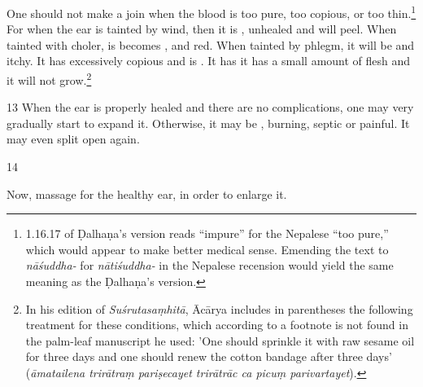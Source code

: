 \begin{translation}
One should not make a join when the blood is too pure, too copious, or too
thin.\footnote{1.16.17 of Ḍalhaṇa's version \citep[79]{vulgate} reads “impure” for
    the Nepalese “too pure,” which would appear to make better medical sense. 
    Emending the text to \emph{nāśuddha-} for \emph{nātiśuddha-} in the Nepalese
    recension would yield the same meaning as the Ḍalhaṇa's version.} For when the ear
    is tainted by wind, then it is , unhealed and
    will peel. When tainted with choler, is becomes ,
     and red.  When tainted by phlegm, it will be 
    and itchy.  It has excessively copious  and is .  It has it has a small amount of  flesh and it will
    not grow.\footnote{In his edition of \emph{Suśrutasaṃhitā}, Ācārya \citep[79 n.
        1]{vulgate} includes in parentheses the following treatment for these conditions,
        which according to a footnote is not found in the palm-leaf manuscript he used:
        'One should sprinkle it with raw sesame oil for three days and one should renew
        the cotton bandage after three days' (\emph{āmatailena trirātraṃ pariṣecayet
        trirātrāc ca picuṃ parivartayet}).}
    
\item[13] When the ear is properly healed and there are no complications,  one may
very gradually start to expand it.  Otherwise, it may be ,
burning, septic or painful.  It may even split open again.
    
\item [14]
    
Now, massage for the healthy ear, in order to enlarge it.
     

\end{translation}
